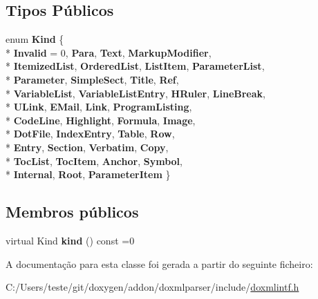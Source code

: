 \subsection*{Tipos Públicos}
\begin{DoxyCompactItemize}
\item 
enum {\bfseries Kind} \{ \\*
{\bfseries Invalid} = 0, 
{\bfseries Para}, 
{\bfseries Text}, 
{\bfseries Markup\-Modifier}, 
\\*
{\bfseries Itemized\-List}, 
{\bfseries Ordered\-List}, 
{\bfseries List\-Item}, 
{\bfseries Parameter\-List}, 
\\*
{\bfseries Parameter}, 
{\bfseries Simple\-Sect}, 
{\bfseries Title}, 
{\bfseries Ref}, 
\\*
{\bfseries Variable\-List}, 
{\bfseries Variable\-List\-Entry}, 
{\bfseries H\-Ruler}, 
{\bfseries Line\-Break}, 
\\*
{\bfseries U\-Link}, 
{\bfseries E\-Mail}, 
{\bfseries Link}, 
{\bfseries Program\-Listing}, 
\\*
{\bfseries Code\-Line}, 
{\bfseries Highlight}, 
{\bfseries Formula}, 
{\bfseries Image}, 
\\*
{\bfseries Dot\-File}, 
{\bfseries Index\-Entry}, 
{\bfseries Table}, 
{\bfseries Row}, 
\\*
{\bfseries Entry}, 
{\bfseries Section}, 
{\bfseries Verbatim}, 
{\bfseries Copy}, 
\\*
{\bfseries Toc\-List}, 
{\bfseries Toc\-Item}, 
{\bfseries Anchor}, 
{\bfseries Symbol}, 
\\*
{\bfseries Internal}, 
{\bfseries Root}, 
{\bfseries Parameter\-Item}
 \}
\end{DoxyCompactItemize}
\subsection*{Membros públicos}
\begin{DoxyCompactItemize}
\item 
\hypertarget{class_i_doc_a27e5d1dde6c9e861b52afa5a95f71d2d}{virtual Kind {\bfseries kind} () const =0}\label{class_i_doc_a27e5d1dde6c9e861b52afa5a95f71d2d}

\end{DoxyCompactItemize}


A documentação para esta classe foi gerada a partir do seguinte ficheiro\-:\begin{DoxyCompactItemize}
\item 
C\-:/\-Users/teste/git/doxygen/addon/doxmlparser/include/\hyperlink{include_2doxmlintf_8h}{doxmlintf.\-h}\end{DoxyCompactItemize}
